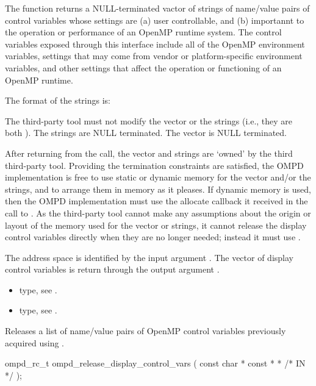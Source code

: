 \descr
The function  returns a
NULL-terminated vactor of strings of name/value pairs of control
variables whose settings are (a) user controllable,
and (b) importannt to the operation or performance of an OpenMP
runtime system.
The control variables exposed through this interface include all
of the OpenMP environment variables, settings that may come from
vendor or platform-specific environment variables, and other
settings that affect the operation or functioning of an OpenMP
runtime.

The format of the strings is:
\begin{center}
\end{center}

The third-party tool must not modify the vector or the strings
(i.e., they are both ).
The strings are NULL terminated.
The vector is NULL terminated.

After returning from the call, the vector and strings are `owned'
by the third third-party tool.
Providing the termination constraints are satisfied, the OMPD
implementation is free to use static or dynamic memory for the
vector and/or the strings, and to arrange them in memory
as it pleases.
If dynamic memory is used, then the OMPD implementation must use
the allocate callback it received in the call to .
As the third-party tool cannot make any assumptions about the origin or
layout of the memory used for the vector or strings, it cannot release
the display control variables directly when they are no longer
needed; instead it must use .

\argdesc
The address space is identified by the input argument .
The vector of display control variables is return through
the output argument .

\crossreferences
\begin{itemize}
	\item {} type, see .
	\item {} type, see .
\end{itemize}


\label{sec:ompd_release_display_control_vars}
\summary

Releases a list of name/value pairs of OpenMP control variables
previously acquired using .
\format
\cspecificstart
\begin{boxedcode}
ompd\_rc\_t ompd\_release\_display\_control\_vars (
  const char * const *        *         /* IN */
);
\end{boxedcode}
\cspecificend

